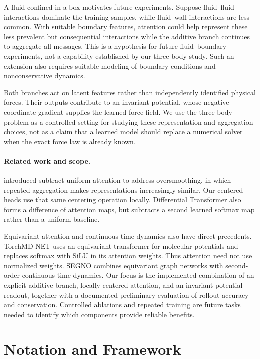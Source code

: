 \documentclass[10pt,letterpaper,twocolumn]{article}
\numberwithin{equation}{section}
\begin{document}
A fluid confined in a box motivates future experiments. Suppose fluid--fluid interactions dominate
the training samples, while fluid--wall interactions are less common. With suitable boundary
features, attention could help represent these less prevalent but consequential interactions while
the additive branch continues to aggregate all messages. This is a hypothesis for future
fluid--boundary experiments, not a capability established by our three-body study. Such an extension
also requires suitable modeling of boundary conditions and nonconservative dynamics.

Both branches act on latent features rather than independently identified physical forces. Their
outputs contribute to an invariant potential, whose negative coordinate gradient supplies the
learned force field. We use the three-body problem as a controlled setting for studying these
representation and aggregation choices, not as a claim that a learned model should replace a
numerical solver when the exact force law is already known.

\paragraph{Related work and scope.}
\citet{ali2023centered} introduced subtract-uniform attention to address oversmoothing, in which
repeated aggregation makes representations increasingly similar. Our centered heads use that same
centering operation locally. Differential Transformer
\citep{ye2025differential} also forms a difference of attention maps, but subtracts a second learned
softmax map rather than a uniform baseline.

Equivariant attention and continuous-time dynamics also have direct precedents. TorchMD-NET
\citep{tholke2022equivariant} uses an equivariant transformer for molecular potentials and replaces
softmax with SiLU in its attention weights. Thus attention need not use normalized weights.
SEGNO \citep{liu2024segno} combines equivariant graph networks with second-order continuous-time
dynamics. Our focus is the implemented combination of an explicit additive branch, locally
centered attention, and an invariant-potential readout, together with a documented preliminary
evaluation of rollout accuracy and conservation. Controlled ablations and repeated training are
future tasks needed to identify which components provide reliable benefits.

\section{Notation and Framework}
\label{sec:framework}
\end{document}

